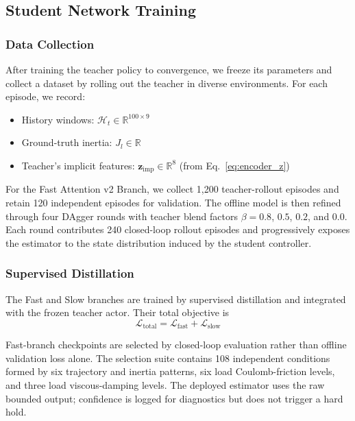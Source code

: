 \documentclass[letterpaper,journal]{IEEEtran}
\begin{document}
\subsection{Student Network Training}

\subsubsection{Data Collection}

After training the teacher policy to convergence, we freeze its parameters and collect a dataset by rolling out the teacher in diverse environments. For each episode, we record:
\begin{itemize}
\item History windows: $\mathcal{H}_t \in \mathbb{R}^{100 \times 9}$
\item Ground-truth inertia: $J_l \in \mathbb{R}$
\item Teacher's implicit features: $\bm{z}_{\text{imp}} \in \mathbb{R}^8$ (from Eq.~\ref{eq:encoder_z})
\end{itemize}

For the Fast Attention v2 Branch, we collect 1,200 teacher-rollout episodes and retain 120 independent episodes for validation. The offline model is then refined through four DAgger rounds with teacher blend factors $\beta=0.8$, $0.5$, $0.2$, and $0.0$. Each round contributes 240 closed-loop rollout episodes and progressively exposes the estimator to the state distribution induced by the student controller.

\subsubsection{Supervised Distillation}

The Fast and Slow branches are trained by supervised distillation and integrated with the frozen teacher actor. Their total objective is
\begin{equation}
\mathcal{L}_{\text{total}} = \mathcal{L}_{\text{fast}} + \mathcal{L}_{\text{slow}} \label{eq:total_loss}
\end{equation}

Fast-branch checkpoints are selected by closed-loop evaluation rather than offline validation loss alone. The selection suite contains 108 independent conditions formed by six trajectory and inertia patterns, six load Coulomb-friction levels, and three load viscous-damping levels. The deployed estimator uses the raw bounded output; confidence is logged for diagnostics but does not trigger a hard hold.
\end{document}
